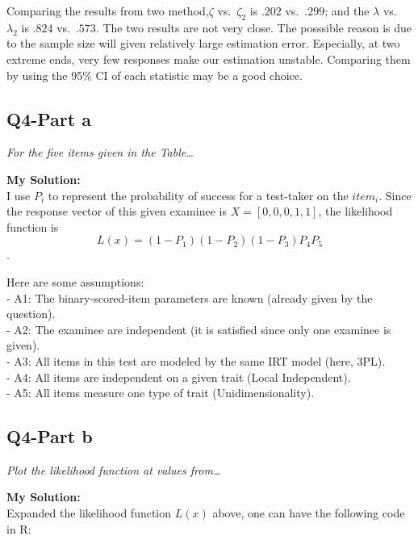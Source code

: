 \documentclass[
]{article}
\begin{document}
Comparing the results from two method,\(\zeta\) vs.~\(\zeta_2\) is
\(.202\) vs.~\(.299\); and the \(\lambda\) vs.~\(\lambda_2\) is \(.824\)
vs.~\(.573\). The two results are not very close. The posssible reason
is due to the sample size will given relatively large estimation error.
Especially, at two extreme ends, very few responses make our estimation
unstable. Comparing them by using the 95\% CI of each statistic may be a
good choice.

\hypertarget{q4-part-a}{%
\subsection{Q4-Part a}\label{q4-part-a}}

\emph{For the five items given in the Table\ldots{}}

\textbf{My Solution: }\\
I use \(P_i\) to represent the probability of success for a test-taker
on the \(item_i\). Since the response vector of this given examinee is
\(X=[0,0,0,1,1]\), the likelihood function is
\[L(x) = (1-P_1)(1-P_2)(1-P_3)P_4P_5\].

Here are some assumptions:\\
- A1: The binary-scored-item parameters are known (already given by the
question).\\
- A2: The examinee are independent (it is satisfied since only one
examinee is given).\\
- A3: All items in this test are modeled by the same IRT model (here,
3PL).\\
- A4: All items are independent on a given trait (Local Independent).\\
- A5: All items measure one type of trait (Unidimensionality).

\hypertarget{q4-part-b}{%
\subsection{Q4-Part b}\label{q4-part-b}}

\emph{Plot the likelihood function at values from\ldots{}}

\textbf{My Solution: }\\
Expanded the likelihood function \(L(x)\) above, one can have the
following code in R:
\end{document}
